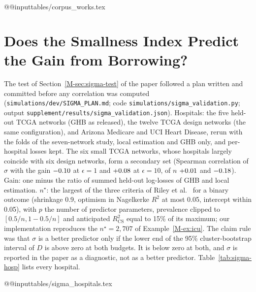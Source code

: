 \documentclass[acmsmall,screen,nonacm]{acmart}
\theoremstyle{acmdefinition}
\begin{document}
{\scriptsize
\csname @@input\endcsname tables/corpus_works.tex 
}

\section{Does the Smallness Index Predict the Gain from Borrowing?}\label{sec:sigma}

The test of Section~\ref{M-sec:sigma-test} of the paper followed a plan written and committed before any correlation was computed (\texttt{simulations/dev/SIGMA\_PLAN.md}; code \texttt{simulations/sigma\_validation.py}; output \texttt{supplement/results/sigma\_validation.json}). Hospitals: the five held-out TCGA networks (GHB as released), the twelve TCGA design networks (the same configuration), and Arizona Medicare and UCI Heart Disease, rerun with the folds of the seven-network study, local estimation and GHB only, and per-hospital losses kept. The six small TCGA networks, whose hospitals largely coincide with six design networks, form a secondary set (Spearman correlation of $\sigma$ with the gain $-0.10$ at $\epsilon=1$ and $+0.08$ at $\epsilon=10$, of $n$ $+0.01$ and $-0.18$). Gain: one minus the ratio of summed held-out log-losses of GHB and local estimation. $n^{\star}$: the largest of the three criteria of Riley et al.\ \cite{riley2019minimumsample} for a binary outcome (shrinkage 0.9, optimism in Nagelkerke $R^2$ at most 0.05, intercept within 0.05), with $p$ the number of predictor parameters, prevalence clipped to $[0.5/n,1-0.5/n]$ and anticipated $R^2_{\mathrm{CS}}$ equal to 15\% of its maximum; our implementation reproduces the $n^{\star}=2{,}707$ of Example~\ref{M-ex:icu}. The claim rule was that $\sigma$ is a better predictor only if the lower end of the 95\% cluster-bootstrap interval of $D$ is above zero at both budgets. It is below zero at both, and $\sigma$ is reported in the paper as a diagnostic, not as a better predictor. Table~\ref{tab:sigma-hosp} lists every hospital.

{\scriptsize
\setlength{\tabcolsep}{4pt}
\csname @@input\endcsname tables/sigma_hospitals.tex 
}



\end{document}
